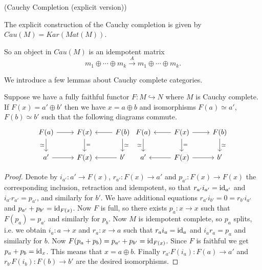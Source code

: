 \begin{definition} \label{definition/cauchy-completion/explicit} (Cauchy Completion (explicit version))

  \noindent The explicit construction of the Cauchy completion is given by
  $Cau(M)=Kar(Mat(M))$.
\end{definition}

\noindent So an object in $Cau(M)$ is an idempotent
matrix $$m_1\oplus\cdots\oplus m_k \xrightarrow{A} m_1\oplus\cdots\oplus
m_k.$$

\noindent We introduce a few lemmas about Cauchy complete categories.

\begin{lemma} \label{direct_sum}
  Suppose we have a fully faithful functor $F:M\hookrightarrow N$ where $M$ is
  Cauchy complete. If $F(x)=a'\oplus b'$ then we have $x=a\oplus b$ and
  isomorphisms $F(a)\simeq a'$, $F(b)\simeq b'$ such that the following
  diagrams commute.
  \[
    \begin{tikzcd}
      {F(a)} & {F(x)} & {F(b)} \\
      {a'} & {F(x)} & {b'}
      \arrow[from=1-1, to=1-2]
      \arrow["\simeq"', from=1-1, to=2-1]
      \arrow["{=}", from=1-2, to=2-2]
      \arrow[from=1-3, to=1-2]
      \arrow["\simeq", from=1-3, to=2-3]
      \arrow[from=2-1, to=2-2]
      \arrow[from=2-3, to=2-2]
    \end{tikzcd} \begin{tikzcd}
      {F(a)} & {F(x)} & {F(b)} \\
      {a'} & {F(x)} & {b'}
      \arrow["\simeq"', from=1-1, to=2-1]
      \arrow[from=1-2, to=1-1]
      \arrow[from=1-2, to=1-3]
      \arrow["{=}", from=1-2, to=2-2]
      \arrow["\simeq", from=1-3, to=2-3]
      \arrow[from=2-2, to=2-1]
      \arrow[from=2-2, to=2-3]
    \end{tikzcd}
  \]
\end{lemma}

\begin{proof}
  Denote by $i_{a'}:a'\to F(x)$, $r_{a'}:F(x)\to a'$ and $p_{a'}:F(x)\to F(x)$
  the corresponding inclusion, retraction and idempotent, so that
  $r_{a'}i_{a'}=\operatorname{id}_{a'}$ and $i_{a'} r_{a'}=p_{a'}$, and similarly for $b'$.
  We have additional equations $r_{a'}i_{b'}=0=r_{b'}i_{a'}$ and
  $p_{a'}+p_{b'}=\operatorname{id}_{F(x)}$. Now $F$ is full, so there exists $p_a:x\to x$
  such that $F(p_a)=p_{a'}$ and similarly for $p_b$. Now $M$ is idempotent
  complete, so $p_a$ splits, i.e. we obtain $i_a:a\to x$ and $r_a:x\to a$ such
  that $r_a i_a=\operatorname{id}_a$ and $i_a r_a=p_a$ and similarly for $b$. Now
  $F(p_a+p_b)=p_{a'}+p_{b'}=\operatorname{id}_{F(x)}$. Since $F$ is faithful we get
  $p_a+p_b=\operatorname{id}_x$. This means that $x=a\oplus b$. Finally
  $r_{a'}F(i_a):F(a)\to a'$ and $r_{b'}F(i_b):F(b)\to b'$ are the desired
  isomorphisms.
\end{proof}

